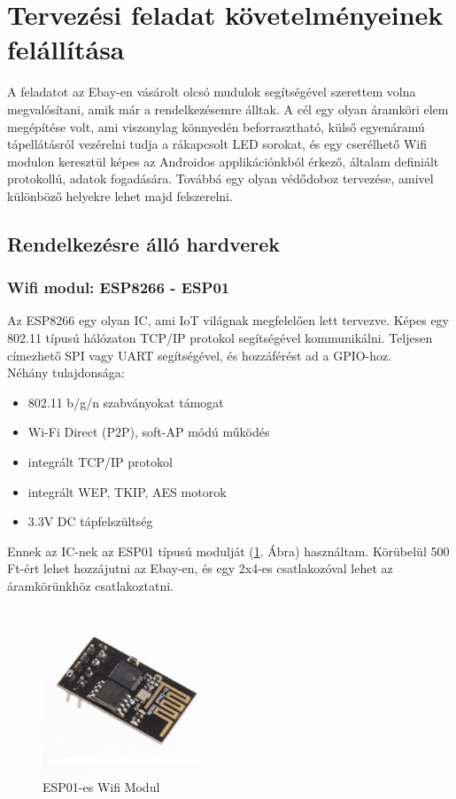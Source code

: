 \documentclass[../main.tex]{subfiles}
\begin{document}
\section{Tervezési feladat követelményeinek felállítása}
    A feladatot az Ebay-en vásárolt olcsó mudulok segítségével szerettem volna megvalósítani, amik már a rendelkezésemre álltak. A cél egy olyan áramköri elem megépítése volt, ami viszonylag könnyedén beforrasztható, külső egyenáramú tápellátásról vezérelni tudja a rákapcsolt LED sorokat, és egy cserélhető Wifi modulon keresztül képes az Androidos applikációnkból érkező, általam definiált protokollú, adatok fogadására. Továbbá egy olyan védődoboz tervezése, amivel különböző helyekre lehet majd felszerelni.
    
    \subsection{Rendelkezésre álló hardverek}
        \subsubsection{Wifi modul: ESP8266 - ESP01} %
            Az ESP8266 egy olyan IC, ami IoT világnak megfelelően lett tervezve. Képes egy 802.11 típusú hálózaton TCP/IP protokol segítségével kommunikálni. Teljesen címezhető SPI vagy UART segítségével, és hozzáférést ad a GPIO-hoz.\\[12px]
            Néhány tulajdonsága:
            \begin{itemize}
                \item 802.11 b/g/n szabványokat támogat
                \item Wi-Fi Direct (P2P), soft-AP módú működés
                \item integrált TCP/IP protokol
                \item integrált WEP, TKIP, AES motorok
                \item 3.3V DC tápfelszültség
            \end{itemize}
            
            Ennek az IC-nek az ESP01 típusú modulját (\ref{fig:esp01}. Ábra) használtam. Körübelül 500 Ft-ért lehet hozzájutni az Ebay-en, és egy 2x4-es csatlakozóval lehet az áramkörünkhöz csatlakoztatni.
            
            \begin{figure}[h!]
                \centering
                    \includegraphics[width=5cm]{resources/pcb_res/esp01.jpg}
                \caption{ESP01-es Wifi Modul}
                \label{fig:esp01}
            \end{figure}
        
\end{document}
